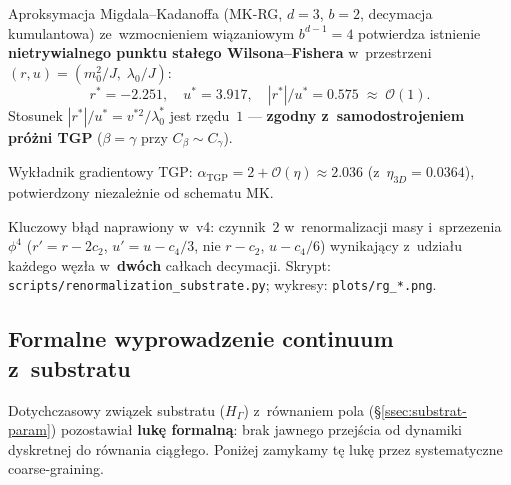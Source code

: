 \begin{remark}\label{rem:mk-rg-results}
Aproksymacja Migdala--Kadanoffa (MK-RG, $d{=}3$, $b{=}2$, decymacja
kumulantowa) ze~wzmocnieniem wi\k{a}zaniowym $b^{d-1} = 4$
potwierdza istnienie \textbf{nietrywialnego punktu sta\l{}ego
Wilsona--Fishera} w~przestrzeni $(r, u) = (m_0^2/J,\; \lambda_0/J)$:
\begin{equation}
  r^* = -2.251, \quad u^* = 3.917, \quad
  |r^*|/u^* = 0.575 \;\approx\; \mathcal{O}(1).
  \label{eq:WF-fp}
\end{equation}
Stosunek $|r^*|/u^* = v^{*2}\!/\lambda_0^*$ jest rz\k{e}du~$1$
--- \textbf{zgodny z~samodostrojeniem pr\'o\.zni TGP}
($\beta = \gamma$ przy $C_\beta \sim C_\gamma$).

Wyk\l{}adnik gradientowy TGP:
$\alpha_{\mathrm{TGP}} = 2 + \mathcal{O}(\eta)
\approx 2.036$ (z~$\eta_{3D} = 0.0364$),
potwierdzony niezale\.znie od schematu MK.

Kluczowy b\l{}\k{a}d naprawiony w~v4: czynnik~$2$
w~renormalizacji masy i~sprzezenia $\phi^4$
($r' = r - 2c_2$, $u' = u - c_4/3$, nie $r - c_2$, $u - c_4/6$)
wynikaj\k{a}cy z~udzia\l{}u ka\.zdego w\k{e}z\l{}a
w~\textbf{dw\'och} ca\l{}kach decymacji.
Skrypt: \texttt{scripts/renormalization\_substrate.py};
wykresy: \texttt{plots/rg\_*.png}.
\end{remark}

\subsection{Formalne wyprowadzenie continuum z~substratu}\label{ssec:continuum-derivation}

Dotychczasowy zwi\k{a}zek substratu ($H_\Gamma$) z~r\'ownaniem pola
(\S\ref{ssec:substrat-param}) pozostawia\l{} \textbf{luk\k{e} formaln\k{a}}:
brak jawnego przej\'scia od dynamiki dyskretnej do r\'ownania
ci\k{a}g\l{}ego. Poni\.zej zamykamy t\k{e} luk\k{e} przez
systematyczne coarse-graining.


